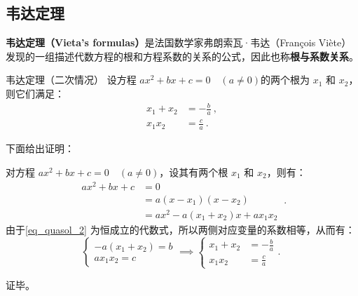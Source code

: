 \subsection{韦达定理}

\textbf{韦达定理（Vieta's formulas）}是法国数学家弗朗索瓦·韦达（François Viète）发现的一组描述代数方程的根和方程系数的关系的公式，因此也称\textbf{根与系数关系}。

\begin{theorem}{韦达定理（二次情况）}
设方程 $a x^2 + b x + c = 0\quad(a \neq 0)$的两个根为 $x_1$ 和 $x_2$，则它们满足：
$$\begin{aligned}
x_1 + x_2 &= -\frac{b}{a} ~,\\
x_1 x_2 &= \frac{c}{a}~.
\end{aligned}$$
\end{theorem}

下面给出证明：

对方程 $a x^2 + b x + c = 0\quad(a \neq 0)$，设其有两个根 $x_1$ 和 $x_2$，则有：
\begin{equation}\label{eq_quasol_2}
\begin{split}
ax^2+bx+c &= 0 \\ 
&=a(x-x_1)(x-x_2)\\
&=ax^2-a(x_1+x_2)x+ax_1x_2
\end{split}~.
\end{equation}
由于\autoref{eq_quasol_2} 为恒成立的代数式，所以两侧对应变量的系数相等，从而有：
\begin{equation}
\begin{cases}
-a(x_1+x_2)=b\\
ax_1x_2=c
\end{cases}
\implies
\begin{cases}
x_1 + x_2 &= \displaystyle-\frac{b}{a} \\
x_1 x_2 &= \displaystyle\frac{c}{a}
\end{cases}.~
\end{equation}

证毕。

